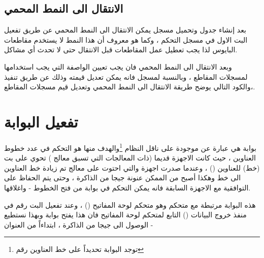\documentclass[document.tex]{subfiles}
\begin{document}
 
\subsection{الانتقال الى النمط المحمي}
بعد إنشاء جدول  وتحميل مسجل  يمكن الانتقال الى النمط المحمي عن طريق تفعيل البت الاول في مسجل التحكم ، وكما هو معروف أن هذا النمط لا يستخدم مقاطعات البايوس لذا يجب تعطيل عمل المقاطعات قبل الانتقال حتى لا تحدث أي مشاكل.

وبعد الانتقال الى النمط المحمي فان يجب تعيين الواصفة التي يجب استخدامها لمسجلات المقاطع ، وبالنسبة لمسجل  فانه يمكن تعديل قيمته وذلك عن طريق تنفيذ  ،والكود التالي يوضح طريقة الانتقال الى النمط المحمي وتعديل قيم مسجلات المقاطع.

 
\begin{english}
\lstset{numberstyle=\tiny,numbers=left,stepnumber=1,numbersep=5pt,tabsize=2,extendedchars=true,breaklines=true,frame=b,showspaces=false, showtabs=false,xleftmargin=10pt,framexleftmargin=10pt,framexrightmargin=5pt,framexbottommargin=4pt,showstringspaces=false,language=[x86masm]Assembler}


\end{english}


\section{تفعيل البوابة }
بوابة  هي عبارة عن  موجودة على ناقل النظام  \footnote{توجد البوابة تحديداً على خط العناوين رقم }والهدف منها هو التحكم في عدد خطوط العناوين ، حيث كانت الاجهزة قديما (ذات المعالجات التي تسبق معالج ) تحوي على  بت (خط) للعناوين () ، وعندما صدرت اجهزة  والتي احتوت على معالج  تم زيادة خط العناوين الى  خط وهكذا أصبح من الممكن عنونة  جيجا من الذاكرة ، وحتى يتم الحفاظ على التوافقية مع الاجهزة السابقة فانه يمكن التحكم في بوابة  من فتح الخطوط - واغلاقها.

هذه البوابة مرتبطة مع متحكم  وهو متحكم لوحة المفاتيح () ، وعند تفعيل البت رقم  في منفذ خروج البيانات () التابع لمتحكم لوحة المفاتيح فان هذا يفتح بوابة  وبهذا نستطيع الوصول الى  جيجا من الذاكرة ، ابتداءاً من العنوان - 
\end{document}
